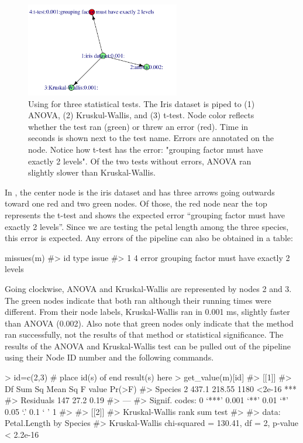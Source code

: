 \begin{figure}[htbp]
  \centering
  \includegraphics[width=0.6\textwidth]{Images/rmonad_threetests}
  \caption{Using  for three statistical tests. The Iris dataset is piped to (1) ANOVA, (2) Kruskul-Wallis, and (3) t-test. Node color reflects whether the test ran (green) or threw an error (red). Time in seconds is shown next to the test name. Errors are annotated on the node. Notice how t-test has the error: "grouping factor must have exactly 2 levels". Of the two tests without errors, ANOVA ran slightly slower than Kruskal-Wallis.}
  \label{fig:rmonad-irispipeline}
\end{figure}

In , the center node is the iris dataset and
has three arrows going outwards toward one red and two green nodes. Of those,
the red node near the top represents the t-test and shows the expected error
``grouping factor must have exactly 2 levels''. Since we are testing the petal
length among the three species, this error is expected. Any errors of the
pipeline can also be obtained in a table:

\begin{example}
missues(m)
#>   id  type                                      issue
#> 1  4 error grouping factor must have exactly 2 levels
\end{example}

Going clockwise, ANOVA and Kruskal-Wallis are represented by nodes 2 and 3. The
green nodes indicate that both ran although their running times were different.
From their node labels, Kruskal-Wallis ran in 0.001 ms, slightly faster than
ANOVA (0.002). Also note that green nodes only indicate that the method ran
successfully, not the results of that method or statistical significance. The
results of the ANOVA and Kruskal-Wallis test can be pulled out of the pipeline
using their Node ID number and the following commands.

\begin{example}
> id=c(2,3)           # place id(s) of end result(s) here
> get_value(m)[id]
#> [[1]]
#>              Df Sum Sq Mean Sq F value Pr(>F)    
#> Species       2  437.1  218.55    1180 <2e-16 ***
#> Residuals   147   27.2    0.19                   
#> ---
#> Signif. codes:  0 ‘***’ 0.001 ‘**’ 0.01 ‘*’ 0.05 ‘.’ 0.1 ‘ ’ 1
#> 
#> [[2]]
#> 	Kruskal-Wallis rank sum test
#> 
#> data:  Petal.Length by Species
#> Kruskal-Wallis chi-squared = 130.41, df = 2, p-value < 2.2e-16
\end{example}


